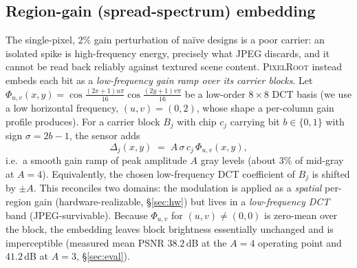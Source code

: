 \documentclass[journal]{IEEEtran}
\newcommand{\pr}{\textup{\textsc{PixelRoot}}}
\begin{document}
\subsection{Region-gain (spread-spectrum) embedding}\label{sec:embed}
The single-pixel, $2\%$ gain perturbation of na\"ive designs is a poor carrier:
an isolated spike is high-frequency energy, precisely what JPEG discards, and it
cannot be read back reliably against textured scene content. \pr{} instead
embeds each bit as a \emph{low-frequency gain ramp over its carrier blocks}. Let
$\Phi_{u,v}(x,y)=\cos\!\frac{(2x{+}1)u\pi}{16}\cos\!\frac{(2y{+}1)v\pi}{16}$ be a
low-order $8\!\times\!8$ DCT basis (we use a low horizontal frequency,
$(u,v)\!=\!(0,2)$, whose shape a per-column gain profile produces). For a
carrier block $B_j$ with chip $c_j$ carrying bit $b\!\in\!\{0,1\}$ with sign
$\sigma=2b{-}1$, the sensor adds
\begin{equation}
\Delta_{j}(x,y) \;=\; A\,\sigma\,c_j\,\Phi_{u,v}(x,y),
\label{eq:embed}
\end{equation}
i.e.\ a smooth gain ramp of peak amplitude $A$ gray levels (about $3\%$ of
mid-gray at $A\!=\!4$). Equivalently, the chosen low-frequency DCT coefficient of
$B_j$ is shifted by $\pm A$. This reconciles two domains: the modulation is applied as a \emph{spatial} per-region
gain (hardware-realizable, \S\ref{sec:hw}) but lives in a \emph{low-frequency
DCT} band (JPEG-survivable). Because $\Phi_{u,v}$ for $(u,v)\!\neq\!(0,0)$ is
zero-mean over the block, the embedding leaves block brightness essentially
unchanged and is imperceptible (measured mean PSNR $38.2$\,dB at the $A\!=\!4$
operating point and $41.2$\,dB at $A\!=\!3$, \S\ref{sec:eval}).
\end{document}
